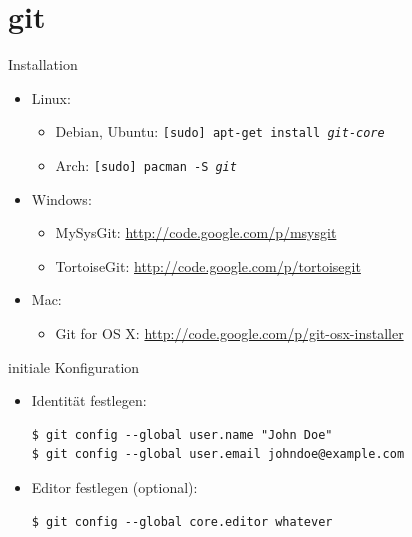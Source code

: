 \section{git}

\begin{frame}
  \tableofcontents[currentsection]
\end{frame}

\begin{frame}{Installation}
  \begin{itemize}
    \item Linux:
    \begin{itemize}
      \item Debian, Ubuntu: \texttt{[sudo] apt-get install \textit{git-core}}
      \item Arch: \texttt{[sudo] pacman -S \textit{git}}
    \end{itemize}
    \item Windows:
    \begin{itemize}
      \item MySysGit: \url{http://code.google.com/p/msysgit}
      \item TortoiseGit: \url{http://code.google.com/p/tortoisegit}
    \end{itemize}
    \item Mac:
    \begin{itemize}
      \item Git for OS X: \url{http://code.google.com/p/git-osx-installer}
    \end{itemize}
  \end{itemize}
\end{frame}

\begin{frame}[fragile]{initiale Konfiguration}
  \begin{itemize}
    \item Identität festlegen:
    \begin{lstlisting}
$ git config --global user.name "John Doe"
$ git config --global user.email johndoe@example.com
    \end{lstlisting}
    \item Editor festlegen (optional):
    \begin{lstlisting}
$ git config --global core.editor whatever
    \end{lstlisting}
    \end{itemize}
\end{frame}

